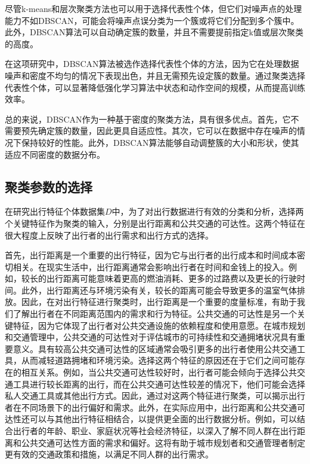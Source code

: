 尽管k-means和层次聚类方法也可以用于选择代表性个体，但它们对噪声点的处理能力不如DBSCAN，可能会将噪声点误分类为一个簇或将它们分配到多个簇中。此外，DBSCAN算法可以自动确定簇的数量，并且不需要提前指定k值或层次聚类的高度。

在这项研究中，DBSCAN算法被选作选择代表性个体的方法，因为它在处理数据噪声和密度不均匀的情况下表现出色，并且无需预先设定簇的数量。通过聚类选择代表性个体，可以显著降低强化学习算法中状态和动作空间的规模，从而提高训练效率。

总的来说，DBSCAN作为一种基于密度的聚类方法，具有很多优点。首先，它不需要预先确定簇的数量，因此更具自适应性。其次，它可以在数据中存在噪声的情况下保持较好的性能。此外，DBSCAN算法能够自动调整簇的大小和形状，使其适应不同密度的数据分布。

\subsection{聚类参数的选择}

在研究出行特征个体数据集$D$中，为了对出行数据进行有效的分类和分析，选择两个关键特征作为聚类的输入，分别是出行距离和公共交通的可达性。这两个特征在很大程度上反映了出行者的出行需求和出行方式的选择。

首先，出行距离是一个重要的出行特征，因为它与出行者的出行成本和时间成本密切相关。在现实生活中，出行距离通常会影响出行者在时间和金钱上的投入。例如，较长的出行距离可能意味着更高的燃油消耗、更多的过路费以及更长的行驶时间。此外，出行距离还与环境污染有关，较长的距离可能会导致更多的温室气体排放。因此，在对出行特征进行聚类时，出行距离是一个重要的度量标准，有助于我们了解出行者在不同距离范围内的需求和行为特征。公共交通的可达性是另一个关键特征，因为它体现了出行者对公共交通设施的依赖程度和使用意愿。在城市规划和交通管理中，公共交通的可达性对于评估城市的可持续性和交通拥堵状况具有重要意义。具有较高公共交通可达性的区域通常会吸引更多的出行者使用公共交通工具，从而减轻道路拥堵和环境污染。选择这两个特征的原因还在于它们之间可能存在的相互关系。例如，当公共交通可达性较好时，出行者可能会倾向于选择公共交通工具进行较长距离的出行，而在公共交通可达性较差的情况下，他们可能会选择私人交通工具或其他出行方式。因此，通过对这两个特征进行聚类，可以揭示出行者在不同场景下的出行偏好和需求。此外，在实际应用中，出行距离和公共交通可达性还可以与其他出行特征相结合，以提供更全面的出行数据分析。例如，可以结合出行者的年龄、职业、家庭状况等社会经济特征，以深入了解不同人群在出行距离和公共交通可达性方面的需求和偏好。这将有助于城市规划者和交通管理者制定更有效的交通政策和措施，以满足不同人群的出行需求。



